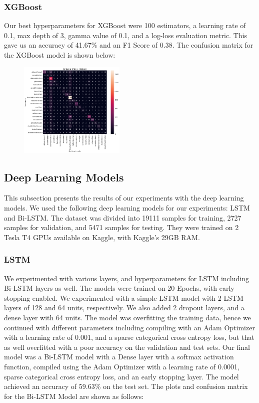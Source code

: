 \subsubsection{XGBoost}
Our best hyperparameters for XGBoost were 100 estimators, a learning rate of 0.1, max depth of 3, gamma value of 0.1, and a log-loss evaluation metric. This gave us an accuracy of 41.67\% and an F1 Score of 0.38. The confusion matrix for the XGBoost model is shown below:
\begin{figure}[H]
    \centering
    \includegraphics[width=0.45\textwidth]{xgboost_confmat.png}
\end{figure}

\subsection{Deep Learning Models}

This subsection presents the results of our experiments with the deep learning models. We used the following deep learning models for our experiments: LSTM and Bi-LSTM. The dataset was divided into 19111 samples for training, 2727 samples for validation, and 5471 samples for testing. They were trained on 2 Tesla T4 GPUs available on Kaggle, with Kaggle's 29GB RAM. 

\subsubsection{LSTM}
We experimented with various layers, and hyperparameters for LSTM including Bi-LSTM layers as well. The models were trained on 20 Epochs, with early stopping enabled. We experimented with a simple LSTM model with 2 LSTM layers of 128 and 64 units, respectively. We also added 2 dropout layers, and a dense layer with 64 units. The model was overfitting the training data, hence we continued with different parameters including compiling with an Adam Optimizer with a learning rate of 0.001, and a sparse categorical cross entropy loss, but that as well overfitted with a poor accuracy on the validation and test sets. Our final model was a Bi-LSTM model with a Dense layer with a softmax activation function, compiled using the Adam Optimizer with a learning rate of 0.0001, sparse categorical cross entropy loss, and an early stopping layer. The model achieved an accuracy of 59.63\% on the test set. The plots and confusion matrix for the Bi-LSTM Model are shown as follows:

